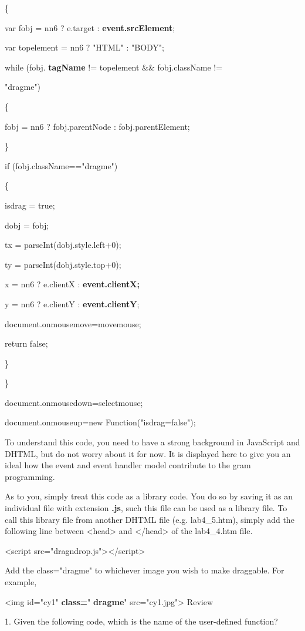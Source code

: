 \documentclass[
]{article}
\begin{document}
\{

var fobj = nn6 ? e.target : \textbf{event.srcElement};

var topelement = nn6 ? "HTML" : "BODY";

while (fobj. \textbf{tagName} != topelement \&\& fobj.className !=

"dragme")

\{

fobj = nn6 ? fobj.parentNode : fobj.parentElement;

\}

if (fobj.className=="dragme")

\{

isdrag = true;

dobj = fobj;

tx = parseInt(dobj.style.left+0);

ty = parseInt(dobj.style.top+0);

x = nn6 ? e.clientX : \textbf{event.clientX;}

y = nn6 ? e.clientY : \textbf{event.clientY};

document.onmousemove=movemouse;

return false;

\}

\}

document.onmousedown=selectmouse;

document.onmouseup=new Function("isdrag=false");

To understand this code, you need to have a strong background in
JavaScript and DHTML, but do not worry about it for now. It is displayed
here to give you an ideal how the event and event handler model
contribute to the gram programming.

As to you, simply treat this code as a library code. You do so by saving
it as an individual file with extension \textbf{.js}, such this file can
be used as a library file. To call this library file from another DHTML
file (e.g. lab4\_5.htm), simply add the following line between
\textless head\textgreater{} and \textless/head\textgreater{} of the
lab4\_4.htm file.

\textless script
src="dragndrop.js"\textgreater\textless/script\textgreater{}

Add the class="dragme" to whichever image you wish to make draggable.
For example,

\textless img id="cy1" \textbf{class=}" \textbf{dragme}"
src="cy1.jpg"\textgreater{} Review

1. Given the following code, which is the name of the user-defined
function?
\end{document}
